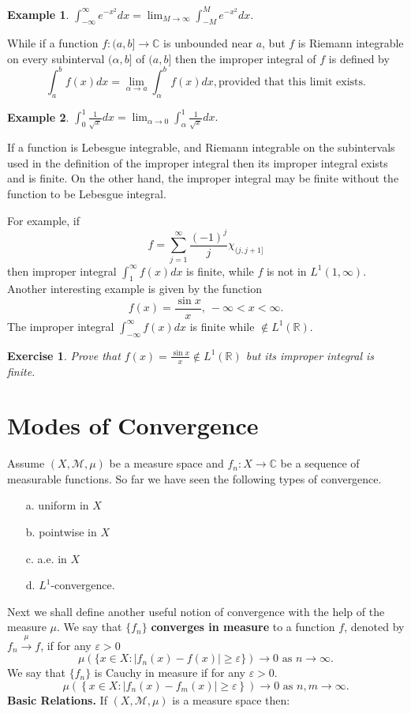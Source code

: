 \documentclass[12pt]{report}
\newtheorem{examp}{Example}[section]
\newtheorem {exercise}[theorem] {Exercise}
\begin{document}
\begin{examp}  $\displaystyle{\int^\infty_{- \infty} e^{-x^2} dx =
\lim_{M \to
\infty} \int^M_{-M} e^{-x^2} dx}.$
\end{examp} While if a function $f: (a, b] \longrightarrow \mathbb{C}$ is
unbounded near $a$, but $f$ is Riemann integrable on every subinterval
$(\alpha, b]$ of $(a, b]$ then the improper integral of $f$  is defined by
\[
\int^b_a f(x) dx = \lim_{\alpha \to a} \int^b_\alpha f(x) dx, \mbox{
provided that this limit exists.}
\]
\begin{examp}  $\displaystyle{\int^1_0 \frac{1}{\sqrt{x}} dx =
\lim_{\alpha \to 0} \int^1_\alpha \frac{1}{\sqrt{x}} dx.}$
\end{examp} If a function is Lebesgue integrable,  and Riemann
integrable on the  subintervals used in the definition of the improper
integral then its improper integral exists and is finite. On the other
hand, the improper integral may be finite without the function to be
Lebesgue integral.

For example, if
\[ f = \sum^\infty_{j=1} \frac{(-1)^j}{j} \chi_{(j, j+1]}
\] then improper integral $\int^\infty_1 f(x) dx$ is finite, while $f$ is 
not in $L^1(1, \infty)$.   Another interesting example is given by the
function
\[ f(x) = \frac{\sin x}{x}, \ - \infty < x < \infty.
\] The improper integral $\int^\infty_{- \infty} f(x) dx$ is finite while 
$\notin L^1(\mathbb{R})$.


\begin{exercise}  Prove that $\displaystyle f(x) = \frac{\sin x}{x} \notin
L^1(\mathbb{R})$ but its improper integral is finite.
\end{exercise}




\section{ Modes of Convergence}
 Assume $(X, \mathcal{M}, \mu)$ be a measure space and $f_n: X
\longrightarrow
\mathbb{C}$ be a sequence of measurable functions.  So far we have seen
the following types of convergence.
\begin{itemize}
\item[a.]  uniform in $X$
\item[b.] pointwise in $X$
\item[c.] a.e. in $X$
\item[d.] $L^1$-convergence.
\end{itemize} Next we shall define another useful notion of convergence
with the help of the measure $\mu$.  We say that  $\{f_n\}$
\textbf{converges  in measure} to a function $f$, denoted by $f_n
\stackrel{\mu}{\longrightarrow} f$, if for any $\varepsilon > 0$
\[
\mu\left (\{x \in X: |f_n (x) - f(x) | \ge \varepsilon \}\right )
\longrightarrow 0
\mbox{ as } n \to \infty.
\]
  We say that
$\{f_n\}$ is Cauchy in measure if for any $\varepsilon > 0$.
\[
\mu\left ( \left \{x \in X: |f_n(x) - f_m (x) | \ge \varepsilon \right  \}
\right )
\longrightarrow 0 \mbox{ as } n, m \to \infty.
\]
\bigskip
\noindent
\textbf{Basic Relations.}  If $(X, \mathcal{M}, \mu)$ is a measure  space
then:
\end{document}
